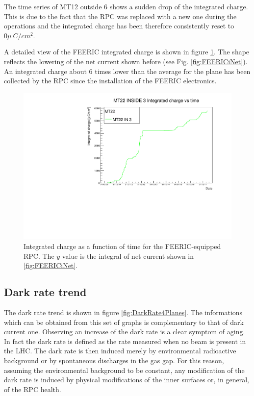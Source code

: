 The time series of MT12 outside 6 shows a sudden drop of the integrated charge. 
This is due to the fact that the RPC was replaced with a new one during the operations and the integrated charge has been therefore consistently reset to $0\mu~C/cm^2$.

A detailed view of the FEERIC integrated charge is shown in figure \ref{fig:FEERICIntCharge}.
The shape reflects the lowering of the net current shown before (see Fig. \ref{fig:FEERICiNet}).
An integrated charge about $6$ times lower than the average for the plane has been collected by the RPC since the installation of the FEERIC electronics.

\begin{figure}[!t]
\begin{center}
\includegraphics[width=0.95\linewidth]{Chapters/Performance/Figs/IntChargeFEERIC.pdf}
\caption{Integrated charge as a function of time for the FEERIC-equipped RPC. The $y$ value is the integral of net current shown in \ref{fig:FEERICiNet}.}
\label{fig:FEERICIntCharge}
\end{center}
\end{figure}

\subsection{Dark rate trend}
The dark rate trend is shown in figure \ref{fig:DarkRate4Planes}.
The informations which can be obtained from this set of graphs is complementary to that of dark current one.
Observing an increase of the dark rate is a clear symptom of aging.
In fact the dark rate is defined as the rate measured when no beam is present in the LHC.
The dark rate is then induced merely by environmental radioactive background or by spontaneous discharges in the gas gap.
For this reason, assuming the environmental background to be constant, any modification of the dark rate is induced by physical modifications of the inner surfaces or, in general, of the RPC health.

